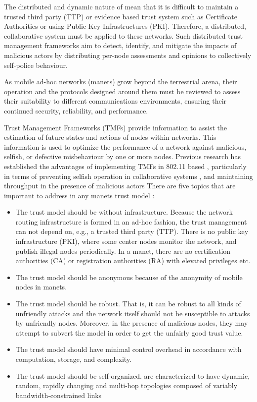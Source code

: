 The distributed and dynamic nature of  mean that it is difficult to maintain a trusted third party (TTP) or evidence based trust system such as Certificate Authorities or using Public Key Infrastructures (PKI).
Therefore, a distributed, collaborative system must be applied to these networks.
Such distributed trust management frameworks aim to detect, identify, and mitigate the impacts of malicious actors by distributing per-node assessments and opinions to collectively self-police behaviour.

As mobile ad-hoc networks (\gls{manet}s) grow beyond the terrestrial arena, their operation and the protocols designed around them must be reviewed to assess their suitability to different communications environments, ensuring their continued security, reliability, and performance.

Trust Management Frameworks (TMFs) provide information to assist the estimation of future states and actions of nodes within networks.
This information is used to optimize the performance of a network against malicious, selfish, or defective misbehaviour by one or more nodes.
Previous research has established the advantages of implementing TMFs in 802.11 based , particularly in terms of preventing selfish operation in collaborative systems \cite{Li2007}, and maintaining throughput in the presence of malicious actors \cite{Buchegger2002}
There are five topics that are important to address in any \gls{manet}s trust model \cite{Kamvar2003}:
\begin{itemize}
  \item The trust model should be without infrastructure.
    Because the network routing infrastructure is formed in an ad-hoc fashion, the trust management can not depend on, e.g., a trusted third party (TTP).
    There is no public key infrastructure (PKI), where some center nodes monitor the network, and publish illegal nodes periodically.
    In a \gls{manet}, there are no certification authorities (CA) or registration authorities (RA) with elevated privileges etc.
  \item The trust model should be anonymous because of the anonymity of mobile nodes in \gls{manet}s.
  \item The trust model should be robust.
    That is, it can be robust to all kinds of unfriendly attacks and the network itself should not be susceptible to attacks by unfriendly nodes.
    Moreover, in the presence of malicious nodes, they may attempt to subvert the model in order to get the unfairly good trust value.
  \item The trust model should have minimal control overhead in accordance with computation, storage, and complexity.
  \item The trust model should be self-organized.
     are characterized to have dynamic, random, rapidly changing and multi-hop topologies composed of variably bandwidth-constrained links
\end{itemize}
